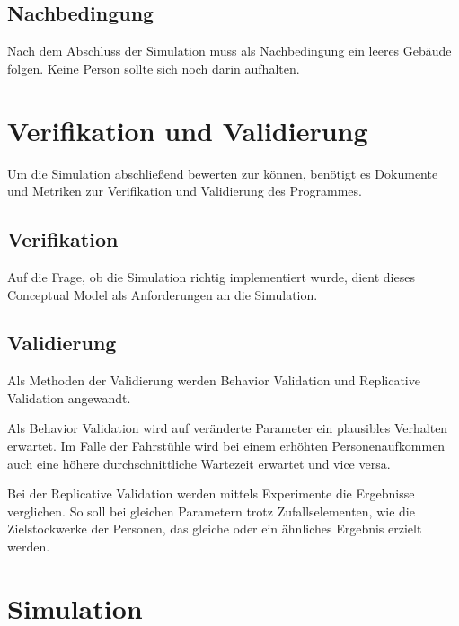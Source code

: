 \documentclass[envcountsame, envcountchap, deutsch]{i-studis}
\begin{document}
\hypertarget{nachbedingung}{%
\section{Nachbedingung}\label{nachbedingung}}

Nach dem Abschluss der Simulation muss als Nachbedingung ein leeres
Gebäude folgen. Keine Person sollte sich noch darin aufhalten.

\hypertarget{verifikation-und-validierung}{%
\chapter{Verifikation und
Validierung}\label{verifikation-und-validierung}}

Um die Simulation abschließend bewerten zur können, benötigt es
Dokumente und Metriken zur Verifikation und Validierung des Programmes.

\hypertarget{verifikation}{%
\section{Verifikation}\label{verifikation}}

Auf die Frage, ob die Simulation richtig implementiert wurde, dient
dieses Conceptual Model als Anforderungen an die Simulation.

\hypertarget{validierung}{%
\section{Validierung}\label{validierung}}

Als Methoden der Validierung werden Behavior Validation und Replicative
Validation angewandt.

Als Behavior Validation wird auf veränderte Parameter ein plausibles
Verhalten erwartet. Im Falle der Fahrstühle wird bei einem erhöhten
Personenaufkommen auch eine höhere durchschnittliche Wartezeit erwartet
und vice versa.

Bei der Replicative Validation werden mittels Experimente die Ergebnisse
verglichen. So soll bei gleichen Parametern trotz Zufallselementen, wie
die Zielstockwerke der Personen, das gleiche oder ein ähnliches Ergebnis
erzielt werden.

\hypertarget{simulation}{%
\chapter{Simulation}\label{simulation}}
\end{document}
